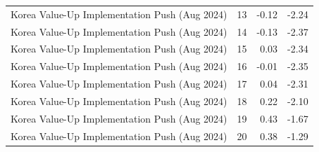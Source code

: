\begin{table}
\begin{tabular}{lrrr}
Korea Value-Up Implementation Push (Aug 2024) & 13 & -0.12 & -2.24 \\
Korea Value-Up Implementation Push (Aug 2024) & 14 & -0.13 & -2.37 \\
Korea Value-Up Implementation Push (Aug 2024) & 15 & 0.03 & -2.34 \\
Korea Value-Up Implementation Push (Aug 2024) & 16 & -0.01 & -2.35 \\
Korea Value-Up Implementation Push (Aug 2024) & 17 & 0.04 & -2.31 \\
Korea Value-Up Implementation Push (Aug 2024) & 18 & 0.22 & -2.10 \\
Korea Value-Up Implementation Push (Aug 2024) & 19 & 0.43 & -1.67 \\
Korea Value-Up Implementation Push (Aug 2024) & 20 & 0.38 & -1.29 \\
\bottomrule
\end{tabular}
\end{table}
